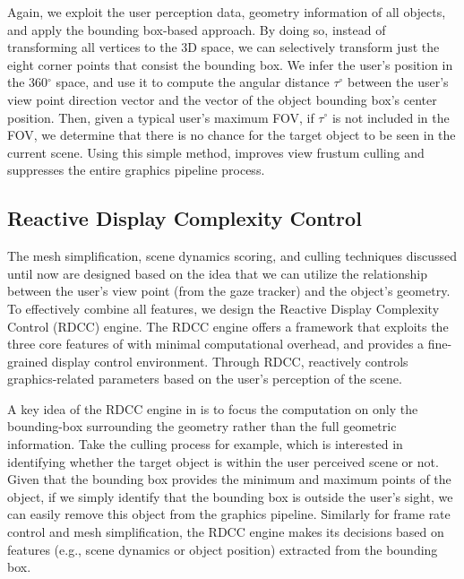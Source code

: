 Again, we exploit the user perception data, geometry information 
of all objects, and apply the bounding box-based approach.
%
By doing so, instead of transforming all vertices to the 3D space, we can selectively transform just the eight corner points that consist the bounding box. 
%
We infer the user's position in the 360$^\circ$ space, and use it to 
compute the angular distance $\tau^\circ$ between the user's view point direction 
vector and the vector of the object bounding box's center position.
%
Then, given a typical user's maximum FOV, if $\tau^\circ$ is not included in the 
FOV, we determine that there is no chance for the target object to be seen in the 
current scene.
%
Using this simple method, {\myit} improves view frustum culling and suppresses the
entire graphics pipeline process.



\subsection{Reactive Display Complexity Control}
\label{sec:rdcc}


%
The mesh simplification, scene dynamics scoring, and culling techniques
discussed until now are designed based on the idea that we can utilize the
relationship between the user's view point (from the gaze tracker) and the 
object's geometry.
%
To effectively combine all {\myit} features, 
we design the Reactive Display Complexity Control (RDCC) engine.
%
The RDCC engine offers a framework that exploits the three core features of
{\myit} with minimal computational overhead, and provides a fine-grained 
display control environment. 
%
Through RDCC, {\myit} reactively controls graphics-related parameters 
based on the user's perception of the scene. 

A key idea of the RDCC engine in {\myit} is to focus the computation on only the 
bounding-box surrounding the geometry rather than the full geometric information.
%
Take the culling process for example, which is interested in identifying 
whether the target object is within the user perceived scene or not.
%
Given that the bounding box provides the minimum and maximum points of the object,
if we simply identify that the bounding box is outside the user's sight, we can
easily remove this object from the graphics pipeline.
%
Similarly for frame rate control and mesh simplification, the RDCC engine makes
its decisions based on features (e.g., scene dynamics or object position) extracted from the bounding box. 

